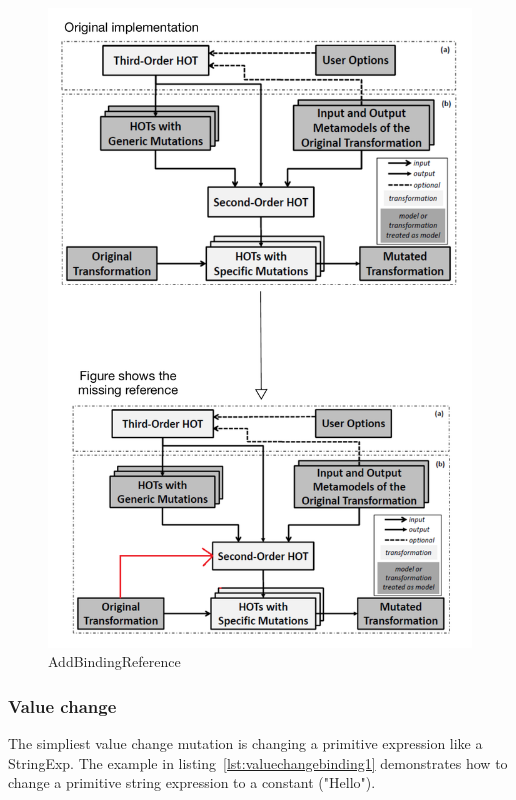\documentclass{llncs}
\begin{document}
\begin{figure}
	\centering
	\includegraphics[angle=0,width=1\textwidth,natwidth=610,natheight=642]{figures/AddBindingMissingReference.pdf}
	\caption{AddBindingReference}
	\label{fig:addBindingReference}
\end{figure}


\subsubsection{Value change}

The simpliest value change mutation is changing a primitive expression like a StringExp. The example in listing~\ref{lst:valuechangebinding1} demonstrates how to change a primitive string expression to a constant ("Hello").
\end{document}
